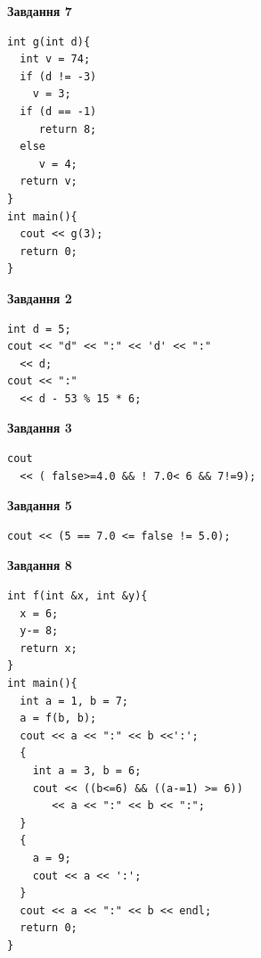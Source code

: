 \documentclass[12pt, ukrainian]{article}
\begin{document}
{\begin {large}
\begin{minipage}[t]{7.0cm}
\begin{center}
\textbf{Завдання 7}
\end{center}
\vspace{-8mm}

\begin{verbatim}
int g(int d){
  int v = 74;
  if (d != -3)
    v = 3;
  if (d == -1)
     return 8;
  else
     v = 4;
  return v;
}
int main(){
  cout << g(3);
  return 0;
}
\end{verbatim}

\end{minipage}
\vline \hspace{1mm}
\begin{minipage}[t]{11.0cm}

\begin{center}
\textbf{Завдання 2}
\end{center}
\vspace{-8mm}

\begin{verbatim}
int d = 5;
cout << "d" << ":" << 'd' << ":" 
  << d;
cout << ":" 
  << d - 53 % 15 * 6;
\end{verbatim}



\begin{center}
\textbf{Завдання 3}
\end{center}
\vspace{-8mm}

\begin{verbatim}
cout 
  << ( false>=4.0 && ! 7.0< 6 && 7!=9);
\end{verbatim}



\begin{center}
\textbf{Завдання 5}
\end{center}
\vspace{-8mm}

\begin{verbatim}
cout << (5 == 7.0 <= false != 5.0);
\end{verbatim}



\begin{center}
\textbf{Завдання 8}
\end{center}
\vspace{-8mm}

\begin{verbatim}
int f(int &x, int &y){
  x = 6;
  y-= 8;
  return x;
}
int main(){
  int a = 1, b = 7;
  a = f(b, b);
  cout << a << ":" << b <<':';
  {
    int a = 3, b = 6;
    cout << ((b<=6) && ((a-=1) >= 6))
       << a << ":" << b << ":";
  }
  {
    a = 9;
    cout << a << ':';
  }
  cout << a << ":" << b << endl;
  return 0;
}
\end{verbatim}


\end{minipage}
\end{large}}
\end{document}
